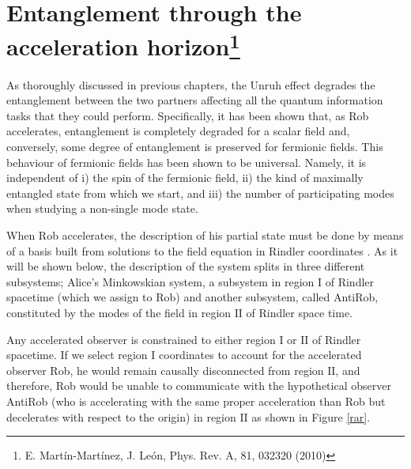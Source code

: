 

\chapter{Entanglement through the acceleration horizon\footnote{E. Mart\'in-Mart\'inez, J. Le\'on, Phys. Rev. A, 81, 032320 (2010)}}\label{etanthrough}


As thoroughly discussed in previous chapters, the Unruh effect degrades the entanglement between the two partners affecting all the quantum information tasks that they could perform. Specifically, it has been shown that, as Rob accelerates, entanglement is completely degraded for a scalar field \cite{Alicefalls} and, conversely, some degree of entanglement is preserved for fermionic fields. This behaviour of fermionic fields has been shown to be universal.  Namely, it is independent of  i) the spin of the fermionic field,  ii) the kind of maximally entangled state from which we start, and iii) the number of participating modes when studying a non-single mode state.

When Rob accelerates, the description of his partial state must be done by means of a basis built from solutions to the field equation in Rindler coordinates \cite{gravitation,Takagi}. As it will be shown below, the description of the system splits in three different subsystems; Alice's Minkowskian system, a subsystem in region I of Rindler spacetime (which we assign to Rob) and another subsystem, called AntiRob, constituted by the modes of the field in region $\text{II}$ of Rindler space time.

Any accelerated observer is constrained to either region I or $\text{II}$ of Rindler spacetime. If we select region I coordinates to account for the accelerated observer Rob, he would remain causally disconnected from region $\text{II}$, and therefore, Rob would be unable to communicate with the hypothetical observer AntiRob (who is accelerating with the same proper acceleration than Rob but decelerates with respect to the origin) in region $\text{II}$ as shown in Figure \ref{rar}.

